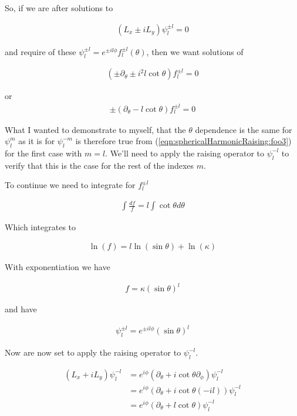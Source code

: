 So, if we are after solutions to 

\begin{align}\label{eqn:sphericalHarmonicRaising:foo1}
(L_x \pm iL_y) \psi_l^{\pm l} = 0
\end{align}

and require of these $\psi_l^{\pm l} = e^{\pm i l \phi} f_l^{\pm l}(\theta)$, then we want solutions of

\begin{align}\label{eqn:sphericalHarmonicRaising:foo2}
(\pm \partial_\theta \pm i^2 l \cot\theta ) f_l^{\pm l} = 0
\end{align}

or
\begin{align}\label{eqn:sphericalHarmonicRaising:foo3}
\pm (\partial_\theta - l \cot\theta ) f_l^{\pm l} = 0
\end{align}

What I wanted to demonstrate to myself, that the $\theta$ dependence is the same for $\psi_l^m$ as it is for $\psi_l^{-m}$ is therefore true from (\ref{eqn:sphericalHarmonicRaising:foo3}) for the first case with $m=l$.  We'll need to apply the raising operator to $\psi_l^{-l}$ to verify that this is the case for the rest of the indexes $m$.

To continue we need to integrate for $f_l^{\pm l}$

\begin{align*}
\int \frac{d f}{f} = l \int \cot\theta d\theta
\end{align*}

Which integrates to

\begin{align*}
\ln(f) = l \ln(\sin\theta) + \ln(\kappa)
\end{align*}

With exponentiation we have

\begin{align*}
f = \kappa (\sin\theta)^l
\end{align*}

and have

\begin{align}\label{eqn:sphericalHarmonicRaising:foo4}
\psi_l^{\pm l} = e^{\pm i l \phi} (\sin\theta)^l
\end{align}

Now are now set to apply the raising operator to $\psi_l^{-l}$.

\begin{align*}
(L_x + iL_y) \psi_l^{-l} 
&=
e^{i\phi} (\partial_\theta + i \cot\theta \partial_\phi) \psi_l^{-l} \\
&=
e^{i\phi} (\partial_\theta + i \cot\theta (-i l)) \psi_l^{-l} \\
&=
e^{i\phi} (\partial_\theta + l \cot\theta ) \psi_l^{-l} \\
\end{align*}

